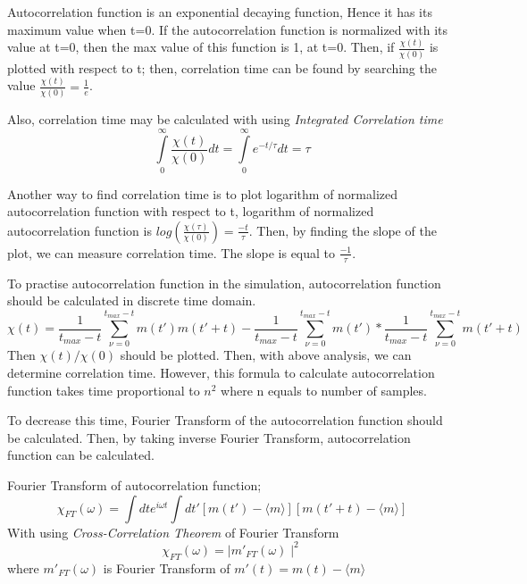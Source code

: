 \documentclass[12pt,fleqn]{report}
\begin{document}
Autocorrelation function is an exponential decaying function, Hence it has its maximum value when t=0. If the autocorrelation function is normalized with its value at t=0, then the max value of this function is 1, at t=0. Then, if $\frac{\chi (t)}{\chi (0)}$ is plotted with respect to t; then, correlation time can be found by searching the value  $\frac{\chi (t)}{\chi (0)} = \frac{1}{e}$. 

Also, correlation time may be calculated with using \textit{Integrated Correlation time}
\begin{equation}
\int\limits_{0}^{\infty} \frac{\chi (t)}{\chi (0)} dt =\int\limits_{0}^{\infty} e^{-t/ \tau} dt = \tau
\end{equation}

Another way to find correlation time is to plot logarithm of normalized autocorrelation function with respect to t, logarithm of normalized autocorrelation function is $log(\frac{\chi (\tau)}{\chi (0)}) = \frac{-t}{\tau}$. Then, by finding the slope of the plot, we can measure correlation time. The slope is equal to $\frac{-1}{\tau}$. 

To practise autocorrelation function in the simulation, autocorrelation function should be calculated in discrete time domain. 
\begin{equation}
\chi (t) = \frac{1}{t_{max} - t} \sum\limits_{\nu = 0 }^{t_{max} - t} m(t')m(t' + t ) - \frac{1}{t_{max} - t} \sum\limits_{\nu = 0 }^{t_{max} - t} m(t') * \frac{1}{t_{max} - t } \sum\limits_{\nu = 0 }^{t_{max} - t} m(t' + t)
\end{equation}
Then $\chi (t) / \chi (0)$ should be plotted. Then, with above analysis, we can determine correlation time. However, this formula to calculate autocorrelation function takes time proportional to $n^2$ where n equals to number of samples. 

To decrease this time, Fourier Transform of the autocorrelation function should be calculated. Then, by taking inverse Fourier Transform, autocorrelation function can be calculated.

Fourier Transform of autocorrelation function;
\begin{equation}
\chi_{FT}(\omega) = \int dte^{i\omega t} \int dt'[m(t') -\langle m\rangle][m(t' + t) - \langle m\rangle] 
\end{equation}
With using \textit{Cross-Correlation Theorem} of Fourier Transform 
\begin{equation}
\chi_{FT} (\omega) = \mid m'_{FT} (\omega) \mid ^2
\end{equation}
where $m'_{FT} (\omega)$ is Fourier Transform of $m'(t) = m(t) - \langle m\rangle$ 
\end{document}
